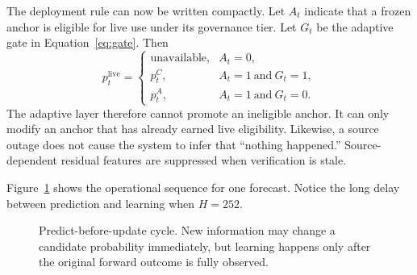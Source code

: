 \documentclass[11pt]{article}
\newcommand{\calF}{\mathcal{F}}
\begin{document}
The deployment rule can now be written compactly. Let $A_t$ indicate that a frozen anchor is eligible for live use under its governance tier. Let $G_t$ be the adaptive gate in Equation~\eqref{eq:gate}. Then
\begin{equation}
p_t^{\mathrm{live}}=
\begin{cases}
\text{unavailable}, & A_t=0,\\[3pt]
p_t^C, & A_t=1\ \text{and}\ G_t=1,\\[3pt]
p_t^A, & A_t=1\ \text{and}\ G_t=0.
\end{cases}
\label{eq:live}
\end{equation}
The adaptive layer therefore cannot promote an ineligible anchor. It can only modify an anchor that has already earned live eligibility. Likewise, a source outage does not cause the system to infer that ``nothing happened.'' Source-dependent residual features are suppressed when verification is stale.

Figure~\ref{fig:onlinecycle} shows the operational sequence for one forecast. Notice the long delay between prediction and learning when $H=252$.

\begin{figure}[tbp]
\centering
{}
\caption{Predict-before-update cycle. New information may change a candidate probability immediately, but learning happens only after the original forward outcome is fully observed.}
\label{fig:onlinecycle}
\end{figure}
\end{document}
